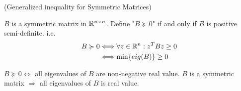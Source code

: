 \begin{definition}{(Generalized inequality for Symmetric Matrices)}{}
    {
        $B$ is a symmetric matrix in $\mathbb{R}^{n\times n}$. Define "$B\succcurlyeq 0$" if and only if $B$ is positive semi-definite. i.e.
        \begin{align*}
            B\succcurlyeq 0 &\Longleftrightarrow \forall z \in \mathbb{R}^n : z^TBz\geq 0\\
                       &\Longleftrightarrow \min\{eig(B)\}\geq 0 
        \end{align*}

    }
\end{definition}

\begin{remark}
    $B\succcurlyeq 0$$\Longleftrightarrow$ all eigenvalues of $B$ are non-negative real value. $B$ is a symmetric matrix $\Rightarrow$ all eigenvalues of $B$ is real value. 
\end{remark}




